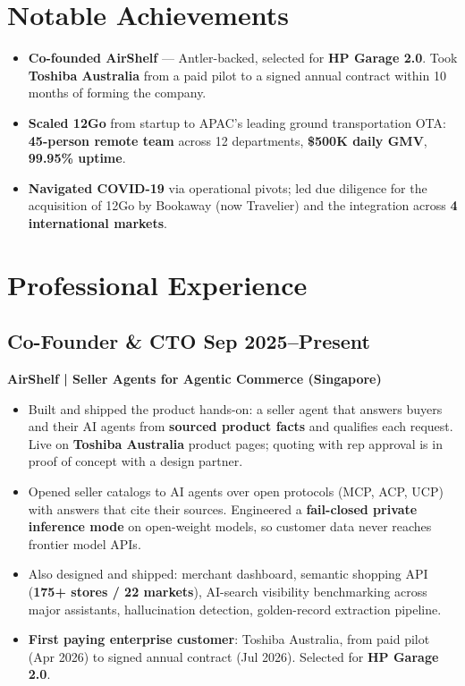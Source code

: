 \documentclass[11pt,a4paper]{article}
\begin{document}
\section*{Notable Achievements}
\begin{itemize}
    \item \textbf{Co-founded AirShelf} --- Antler-backed, selected for \textbf{HP Garage 2.0}. Took \textbf{Toshiba Australia} from a paid pilot to a signed annual contract within 10 months of forming the company.
    \item \textbf{Scaled 12Go} from startup to APAC's leading ground transportation OTA: \textbf{45-person remote team} across 12 departments, \textbf{\$500K daily GMV}, \textbf{99.95\% uptime}.
    \item \textbf{Navigated COVID-19} via operational pivots; led due diligence for the acquisition of 12Go by Bookaway (now Travelier) and the integration across \textbf{4 international markets}.
\end{itemize}

\section*{Professional Experience}

\subsection*{Co-Founder \& CTO \hfill Sep 2025--Present}
\textbf{AirShelf | Seller Agents for Agentic Commerce (Singapore)} 
\begin{itemize}
    \item Built and shipped the product hands-on: a seller agent that answers buyers and their AI agents from \textbf{sourced product facts} and qualifies each request. Live on \textbf{Toshiba Australia} product pages; quoting with rep approval is in proof of concept with a design partner.
    \item Opened seller catalogs to AI agents over open protocols (MCP, ACP, UCP) with answers that cite their sources. Engineered a \textbf{fail-closed private inference mode} on open-weight models, so customer data never reaches frontier model APIs.
    \item Also designed and shipped: merchant dashboard, semantic shopping API (\textbf{175+ stores / 22 markets}), AI-search visibility benchmarking across major assistants, hallucination detection, golden-record extraction pipeline.
    \item \textbf{First paying enterprise customer}: Toshiba Australia, from paid pilot (Apr 2026) to signed annual contract (Jul 2026). Selected for \textbf{HP Garage 2.0}.
\end{itemize}
\end{document}
